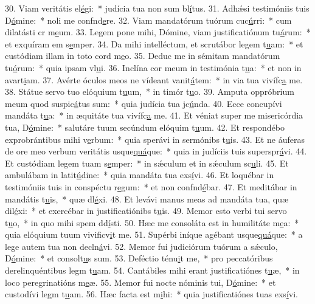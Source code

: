 30. Viam veritátis el\uline{é}gi:~* judícia tua non sum bl\uline{í}tus.
31. Adhǽsi testimóniis tuis D\uline{ó}mine:~* noli me confnd\uline{e}re.
32. Viam mandatórum tuórum cuc\uline{ú}rri:~* cum dilatásti cr m\uline{e}um.
33. Legem pone mihi, Dómine, viam justificatiónum tu\uline{á}rum:~* et exquíram em s\uline{e}mper.
34. Da mihi intelléctum, et scrutábor legem t\uline{u}am:~* et custódiam illam in toto cord m\uline{e}o.
35. Deduc me in sémitam mandatórum tu\uline{ó}rum:~* quia ipsam vl\uline{u}i.
36. Inclína cor meum in testimónia t\uline{u}a:~* et non in avart\uline{i}am.
37. Avérte óculos meos ne vídeant vanit\uline{á}tem:~* in via tua vivífc\uline{a} me.
38. Státue servo tuo elóquium t\uline{u}um,~* in timór t\uline{u}o.
39. Amputa oppróbrium meum quod suspic\uline{á}tus sum:~* quia judícia tua jc\uline{ú}nda.
40. Ecce concupívi mandáta t\uline{u}a:~* in æquitáte tua vivífc\uline{a} me.
41. Et véniat super me misericórdia tua, D\uline{ó}mine:~* salutáre tuum secúndum elóquim t\uline{u}um.
42. Et respondébo exprobrántibus mihi v\uline{e}rbum:~* quia sperávi in sermónibs t\uline{u}is.
43. Et ne áuferas de ore meo verbum veritátis usque\uline{quá}que:~* quia in judíciis tuis superspr\uline{á}vi.
44. Et custódiam legem tuam s\uline{e}mper:~* in sǽculum et in sǽculum sc\uline{u}li.
45. Et ambulábam in latit\uline{ú}dine:~* quia mandáta tua exs\uline{í}vi.
46. Et loquébar in testimóniis tuis in conspéctu r\uline{e}gum:~* et non confnd\uline{é}bar.
47. Et meditábar in mandátis t\uline{u}is,~* quæ dl\uline{é}xi.
48. Et levávi manus meas ad mandáta tua, quæ dil\uline{é}xi:~* et exercébar in justificatiónibs t\uline{u}is.
49. Memor esto verbi tui servo t\uline{u}o,~* in quo mihi spem dd\uline{í}sti.
50. Hæc me consoláta est in humilitáte m\uline{e}a:~* quia elóquium tuum vivificv\uline{i}t me.
51. Supérbi iníque agébant usque\uline{quá}que:~* a lege autem tua non decln\uline{á}vi.
52. Memor fui judiciórum tuórum a sǽculo, D\uline{ó}mine:~* et consolt\uline{u}s sum.
53. Deféctio ténu\uline{i}t me,~* pro peccatóribus derelinquéntibus legm t\uline{u}am.
54. Cantábiles mihi erant justificatiónes t\uline{u}æ,~* in loco peregrinatións m\uline{e}æ.
55. Memor fui nocte nóminis tui, D\uline{ó}mine:~* et custodívi legm t\uline{u}am.
56. Hæc facta est m\uline{i}hi:~* quia justificatiónes tuas exs\uline{í}vi.
